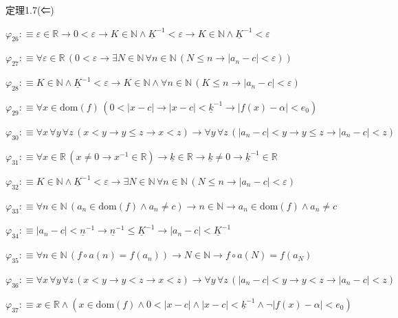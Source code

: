 \begin{fullproof}{定理1.7(⇐)}
\begin{abbrevlist}
\item $\varphi_{26} :\equiv \varepsilon \in \mathbb{R} \to 0 < \varepsilon \to K \in \mathbb{N} \land \underline{K}^{-1} < \varepsilon \to K \in \mathbb{N} \land \underline{K}^{-1} < \varepsilon$
\item $\varphi_{27} :\equiv \forall \varepsilon \in \mathbb{R}\,(0 < \varepsilon \to \exists N \in \mathbb{N}\,\forall n \in \mathbb{N}\,(N \leq n \to \lvert a_{n} - c \rvert < \varepsilon))$
\item $\varphi_{28} :\equiv K \in \mathbb{N} \land \underline{K}^{-1} < \varepsilon \to K \in \mathbb{N} \land \forall n \in \mathbb{N}\,(K \leq n \to \lvert a_{n} - c \rvert < \varepsilon)$
\item $\varphi_{29} :\equiv \forall x \in \mathrm{dom}(f)\,(0 < \lvert x - c \rvert \to \lvert x - c \rvert < \underline{k}^{-1} \to \lvert f(x) - \alpha \rvert < e_{0})$
\item $\varphi_{30} :\equiv \forall x\,\forall y\,\forall z\,(x < y \to y \leq z \to x < z) \to \forall y\,\forall z\,(\lvert a_{n} - c \rvert < y \to y \leq z \to \lvert a_{n} - c \rvert < z)$
\item $\varphi_{31} :\equiv \forall x \in \mathbb{R}\,(x \neq 0 \to x^{-1} \in \mathbb{R}) \to \underline{k} \in \mathbb{R} \to \underline{k} \neq 0 \to \underline{k}^{-1} \in \mathbb{R}$
\item $\varphi_{32} :\equiv K \in \mathbb{N} \land \underline{K}^{-1} < \varepsilon \to \exists N \in \mathbb{N}\,\forall n \in \mathbb{N}\,(N \leq n \to \lvert a_{n} - c \rvert < \varepsilon)$
\item $\varphi_{33} :\equiv \forall n \in \mathbb{N}\,(a_{n} \in \mathrm{dom}(f) \land a_{n} \neq c) \to n \in \mathbb{N} \to a_{n} \in \mathrm{dom}(f) \land a_{n} \neq c$
\item $\varphi_{34} :\equiv \lvert a_{n} - c \rvert < \underline{n}^{-1} \to \underline{n}^{-1} \leq \underline{K}^{-1} \to \lvert a_{n} - c \rvert < \underline{K}^{-1}$
\item $\varphi_{35} :\equiv \forall n \in \mathbb{N}\,(f \circ a(n) = f(a_{n})) \to N \in \mathbb{N} \to f \circ a(N) = f(a_{N})$
\item $\varphi_{36} :\equiv \forall x\,\forall y\,\forall z\,(x < y \to y < z \to x < z) \to \forall y\,\forall z\,(\lvert a_{n} - c \rvert < y \to y < z \to \lvert a_{n} - c \rvert < z)$
\item $\varphi_{37} :\equiv x \in \mathbb{R} \land (x \in \mathrm{dom}(f) \land 0 < \lvert x - c \rvert \land \lvert x - c \rvert < \underline{k}^{-1} \land \neg \lvert f(x) - \alpha \rvert < e_{0})$

\end{abbrevlist}
\end{fullproof}
